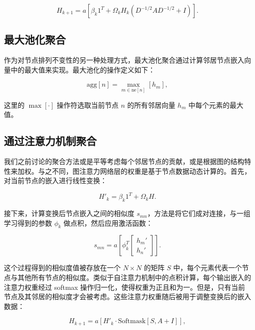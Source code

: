 \begin{equation}
H_{k+1} = a \left[ \beta_k 1^T + \Omega_k H_k (D^{-1/2} A D^{-1/2} + I) \right]. 
\end{equation}

\subsection{最大池化聚合}
作为对节点排列不变性的另一种处理方式，最大池化聚合通过计算邻居节点嵌入向量中的最大值来实现。最大池化的操作定义如下：

\begin{equation}
\text{agg}[n] = \max_{m \in \text{ne}[n]} \left[ h_m \right], 
\end{equation}

这里的 \(\max[\cdot]\) 操作符选取当前节点 \(n\) 的所有邻居向量 \(h_m\) 中每个元素的最大值。

\subsection{通过注意力机制聚合}

我们之前讨论的聚合方法或是平等考虑每个邻居节点的贡献，或是根据图的结构特性来加权。与之不同，图注意力网络层的权重是基于节点数据动态计算的。首先，对当前节点的嵌入进行线性变换：

\begin{equation}
H'_k = \beta_k 1^T + \Omega_k H. 
\end{equation}

接下来，计算变换后节点嵌入之间的相似度 \(s_{mn}\)，方法是将它们成对连接，与一组学习得到的参数 \(\phi_k\) 做点积，然后应用激活函数：

\begin{equation}
s_{mn} = a \left[ \phi_k^T \left[ \begin{array}{c}
h_m' \\
h_n'
\end{array} \right] \right]. 
\end{equation}

这个过程得到的相似度值被存放在一个 \(N \times N\) 的矩阵 \(S\) 中，每个元素代表一个节点与其他所有节点的相似度。类似于自注意力机制中的点积计算，每个输出嵌入的注意力权重经过 softmax 操作归一化，使得权重为正且和为一。但是，只有当前节点及其邻居的相似度才会被考虑。这些注意力权重随后被用于调整变换后的嵌入数据：

\begin{equation}
H_{k+1} = a \left[ H'_k \cdot \text{Softmask}[S, A + I] \right], 
\end{equation}

